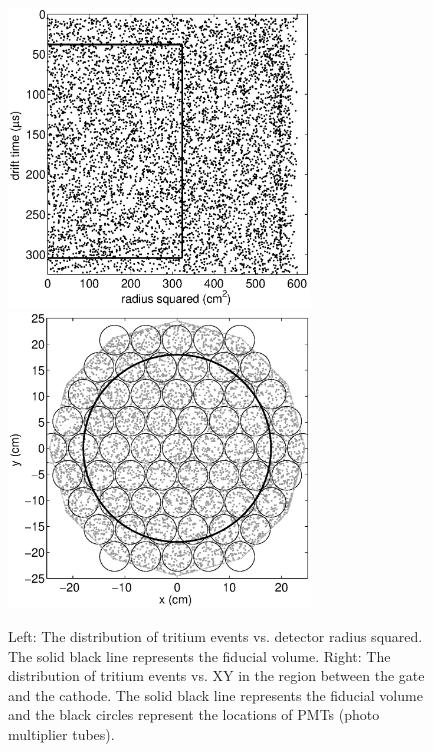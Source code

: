 \begin{figure}[h!]\centering
\includegraphics[width=80mm]{CH3T_RZ_scatter_lux10_20130812T1546.eps}
\includegraphics[width=80mm]{CH3T_XY_scatter_PMT_lux10_20130812T1546.eps}
\caption{Left: The distribution of tritium events vs. detector radius squared. The solid black line represents the fiducial volume. Right: The distribution of tritium events vs. XY in the region between the gate and the cathode. The solid black line represents the fiducial volume and the black circles represent the locations of PMTs (photo multiplier tubes).}
\label{fig:Density}
\end{figure}




